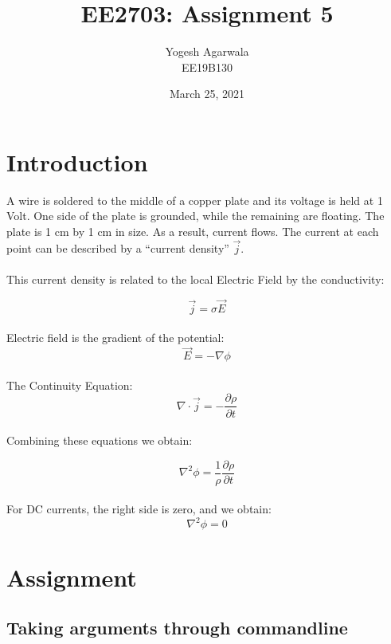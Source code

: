 \documentclass{article}
\title{EE2703: Assignment 5}
\author{Yogesh Agarwala \\ EE19B130}
\date{March 25, 2021}
\begin{document}
\maketitle

\section{Introduction}
A wire is soldered to the middle of a copper plate and its voltage is held at 1 Volt. One side of the plate is
grounded, while the remaining are floating. The plate is 1 cm by 1 cm in size.
As a result, current flows. The current at each
point can be described by a “current density” $\vec{j}$. \\\\
This
current density is related to the local Electric Field by the conductivity:


\begin{equation}
    \vec{j} = \sigma\vec{E}
\end{equation}
\\
Electric field is the gradient of the potential:
\begin{equation}
	\vec{E} = - \nabla \phi
\end{equation}
\\
The Continuity Equation:
\begin{equation}
	\nabla \cdot \vec{j} = - \frac{\partial\rho}{\partial t}
\end{equation}
\\
Combining these equations we obtain:

\begin{equation}
    \nabla^2 \phi =  \frac{1}{\rho}\frac{\partial\rho}{\partial t}
\end{equation}
\\
For DC currents, the right side is zero, and we obtain:
\begin{equation}
    \nabla^2 \phi =  0
\end{equation}

\clearpage

\section{Assignment}
\subsection{Taking arguments through commandline}
\end{document}
